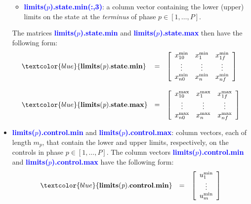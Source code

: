 \documentclass[10pt,final]{report}
\newcommand{\bfblue}[1]{\textcolor{blue}{\bf #1}}
\begin{document}
\begin{itemize}
\begin{itemize}
      \item \bfblue{limits($p$).state.min(:,3)}: a column vector
        containing the lower (upper) limits on the state at the {\em
          terminus} of phase $p\in[1,\ldots,P]$.
      \end{itemize}
      The matrices \bfblue{limits($p$).state.min} and
      \bfblue{limits($p$).state.max} then have the following form:
    \begin{displaymath}
      \begin{array}{lcl}
        \bfblue{limits(\textit{p}).state.min} & = & \left[\begin{array}{ccc} x_{10}^{\textrm{min}}
            & x_{1}^{\textrm{min}} & x_{1f}^{\textrm{min}} \\
            \vdots & \vdots & \vdots \\
            x_{n0}^{\textrm{min}} & x_{n}^{\textrm{min}} & x_{nf}^{\textrm{min}} \\
          \end{array} \right] \\ \\
        \bfblue{limits(\textit{p}).state.max} & = & \left[\begin{array}{ccc} x_{10}^{\textrm{max}}
            & x_{1}^{\textrm{max}} & x_{1f}^{\textrm{max}} \\
            \vdots & \vdots & \vdots \\
            x_{n0}^{\textrm{max}} & x_{n}^{\textrm{max}} & x_{nf}^{\textrm{max}} \\
          \end{array} \right]
      \end{array}
    \end{displaymath}
  \item \bfblue{limits($p$).control.min} and \bfblue{limits($p$).control.max}:  column vectors, each of length
    $m_p$, that contain the lower and upper limits, respectively, on the
    controls in phase $p\in[1,\ldots,P]$.  The column vectors
    \bfblue{limits($p$).control.min} and \bfblue{limits($p$).control.max}
    have the following form:
      \begin{displaymath}
        \begin{array}{lcl}
          \bfblue{limits(\textit{p}).control.min} & = & \left[\begin{array}{c} u_{1}^{\textrm{min}}
              \\ \vdots \\ u_{m}^{\textrm{min}} \end{array} \right] \\ \\

\end{array}
\end{displaymath}
\end{itemize}
\end{document}
